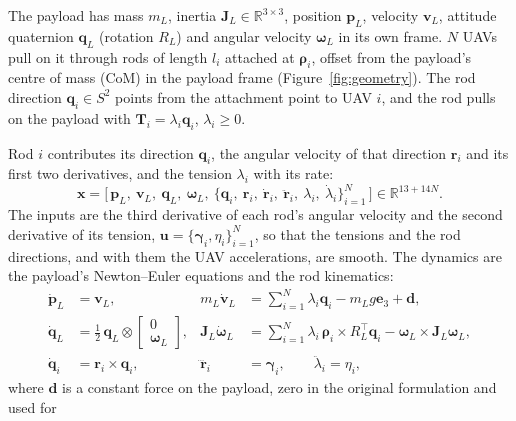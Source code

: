 The payload has mass $m_L$, inertia $\mathbf{J}_L \in \mathbb{R}^{3\times3}$, position $\mathbf{p}_L$,
velocity $\mathbf{v}_L$, attitude quaternion $\mathbf{q}_L$ (rotation $R_L$) and angular velocity
$\boldsymbol{\omega}_L$ in its own frame. $N$ UAVs pull on it through rods of length $l_i$ attached at
$\boldsymbol{\rho}_i$, offset from the payload's centre of mass (CoM) in the payload frame
(Figure~\ref{fig:geometry}). The rod direction $\mathbf{q}_i \in S^2$ points
from the attachment point to UAV $i$, and the rod pulls on the payload with
$\mathbf{T}_i = \lambda_i \mathbf{q}_i$, $\lambda_i \ge 0$.



Rod $i$ contributes its direction $\mathbf{q}_i$, the angular velocity of that direction $\mathbf{r}_i$
and its first two derivatives, and the tension $\lambda_i$ with its rate:
\begin{equation}
    \mathbf{x} = \big[\, \mathbf{p}_L,\ \mathbf{v}_L,\ \mathbf{q}_L,\ \boldsymbol{\omega}_L,\
    \{\mathbf{q}_i,\ \mathbf{r}_i,\ \dot{\mathbf{r}}_i,\ \ddot{\mathbf{r}}_i,\ \lambda_i,\ \dot{\lambda}_i\}_{i=1}^{N} \,\big]
    \in \mathbb{R}^{13+14N}.
\end{equation}
The inputs are the third derivative of each rod's angular velocity and the second derivative of its
tension, $\mathbf{u} = \{\boldsymbol{\gamma}_i, \eta_i\}_{i=1}^N$, so that the tensions and the rod
directions, and with them the UAV accelerations, are smooth. The dynamics are the payload's
Newton--Euler equations and the rod kinematics:
\begin{align}
    \dot{\mathbf{p}}_L &= \mathbf{v}_L, &
    m_L \dot{\mathbf{v}}_L &= \sum_{i=1}^{N} \lambda_i \mathbf{q}_i - m_L g \mathbf{e}_3 + \mathbf{d},
    \label{eq:plan_trans} \\
    \dot{\mathbf{q}}_L &= \tfrac{1}{2}\, \mathbf{q}_L \otimes \begin{bmatrix} 0 \\ \boldsymbol{\omega}_L \end{bmatrix}, &
    \mathbf{J}_L \dot{\boldsymbol{\omega}}_L &= \sum_{i=1}^{N} \lambda_i\, \boldsymbol{\rho}_i \times R_L^\top \mathbf{q}_i
    - \boldsymbol{\omega}_L \times \mathbf{J}_L \boldsymbol{\omega}_L, \\
    \dot{\mathbf{q}}_i &= \mathbf{r}_i \times \mathbf{q}_i, &
    \dddot{\mathbf{r}}_i &= \boldsymbol{\gamma}_i, \qquad \ddot{\lambda}_i = \eta_i,
\end{align}
where $\mathbf{d}$ is a constant force on the payload, zero in the original formulation and used for
